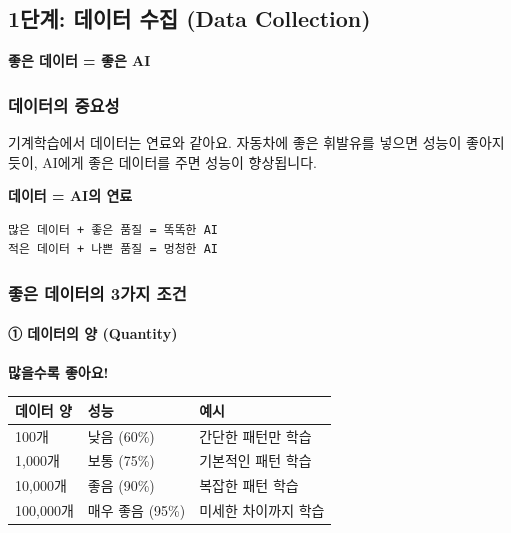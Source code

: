\documentclass[a4paper, 11pt]{article}
\renewenvironment{quote}
  {\begin{tcolorbox}[colback=lightblue!30, colframe=mainblue!50,
   left=8pt, right=8pt, top=4pt, bottom=4pt, breakable]}
  {\end{tcolorbox}}
\begin{document}
\hypertarget{uxb2e8uxacc4-uxb370uxc774uxd130-uxc218uxc9d1-data-collection}{%
\subsection{1단계: 데이터 수집 (Data
Collection)}\label{uxb2e8uxacc4-uxb370uxc774uxd130-uxc218uxc9d1-data-collection}}

\begin{quote}
\textbf{좋은 데이터 = 좋은 AI}
\end{quote}

\hypertarget{uxb370uxc774uxd130uxc758-uxc911uxc694uxc131}{%
\subsubsection{데이터의
중요성}\label{uxb370uxc774uxd130uxc758-uxc911uxc694uxc131}}

기계학습에서 데이터는 연료와 같아요. 자동차에 좋은 휘발유를 넣으면
성능이 좋아지듯이, AI에게 좋은 데이터를 주면 성능이 향상됩니다.

\textbf{데이터 = AI의 연료}

\begin{verbatim}
많은 데이터 + 좋은 품질 = 똑똑한 AI
적은 데이터 + 나쁜 품질 = 멍청한 AI
\end{verbatim}

\hypertarget{uxc88buxc740-uxb370uxc774uxd130uxc758-3uxac00uxc9c0-uxc870uxac74}{%
\subsubsection{좋은 데이터의 3가지
조건}\label{uxc88buxc740-uxb370uxc774uxd130uxc758-3uxac00uxc9c0-uxc870uxac74}}

\hypertarget{uxb370uxc774uxd130uxc758-uxc591-quantity}{%
\paragraph{\textbf{①} 데이터의 양
(Quantity)}\label{uxb370uxc774uxd130uxc758-uxc591-quantity}}

\textbf{많을수록 좋아요!}

\begin{longtable}{p{3cm}p{4cm}p{7cm}}
\toprule\noalign{}
데이터 양 & 성능 & 예시 \\
\midrule\noalign{}
\endhead
\bottomrule\noalign{}
\endlastfoot
100개 & 낮음 (60\%) & 간단한 패턴만 학습 \\
1,000개 & 보통 (75\%) & 기본적인 패턴 학습 \\
10,000개 & 좋음 (90\%) & 복잡한 패턴 학습 \\
100,000개 & 매우 좋음 (95\%) & 미세한 차이까지 학습 \\
\end{longtable}
\end{document}
